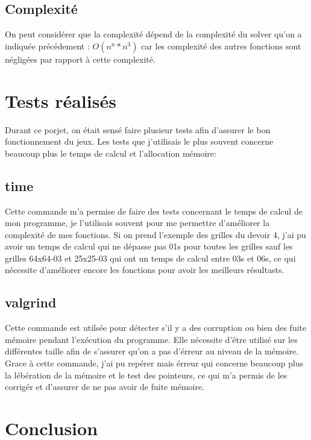 \documentclass[12pt]{article}
\begin{document}
   \subsection{Complexité}
   On peut considérer que la complexité dépend de la complexité du solver qu'on a indiquée précédement : $O(n^n*n^3)$ car les complexité des autres fonctions sont négligées par rapport à cette complexité.
  \section{Tests réalisés}
  Durant ce porjet, on était sensé faire plusieur tests afin d'assurer le bon fonctionnement du jeux. Les tests que j'utilisais le plus souvent concerne beaucoup plus le temps de calcul et l'allocation mémoire:
  \subsection{time}
  Cette commande m'a permise de faire des tests concernant le temps de calcul de mon programme, je l'utilisais souvent pour me permettre d'améliorer la complexité de mes fonctions. Si on prend l'exemple des grilles du devoir 4, j'ai pu avoir un temps de calcul qui ne dépasse pas 01s pour toutes les grilles sauf les grilles 64x64-03 et 25x25-03 qui ont un temps de calcul entre 03s et 06s, ce qui nécessite d'améliorer encore les fonctions pour avoir les meilleurs résultasts.  
  \subsection{valgrind}
  Cette commande est utilsée pour détecter s'il y a des corruption ou bien des fuite mémoire pendant l'exécution du programme. Elle nécessite d'être utilisé sur les différentes taille afin de s'assurer qu'on a pas d'érreur au niveau de la mémoire. Grace à cette commande, j'ai pu repérer mais érreur qui concerne beaucoup plus la lébération de la mémoire et le test des pointeurs, ce qui m'a permis de les corrigér et d'assurer de ne pas avoir de fuite mémoire. 
  \section{Conclusion}
\end{document}
